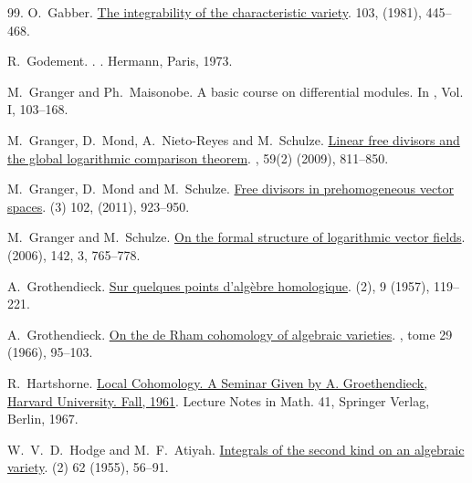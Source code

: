 \documentclass[12pt]{article}
\begin{document}
\begin{thebibliography}{99.}
 O.~Gabber.
\newblock \href{https://doi.org/10.2307/2374101}{The integrability of the characteristic variety}.
 103, (1981), 445--468.

 R.~Godement.
.
.
\newblock Hermann, Paris, 1973.

M.~Granger and Ph.~Maisonobe.
\newblock A basic course on differential modules.
In \cite{cimpa}, Vol. I, 103--168.

M.~Granger, D.~Mond, A.~Nieto-Reyes and M.~Schulze.
\newblock \href{http://aif.cedram.org/item?id=AIF_2009__59_2_811_0}{Linear free divisors and the global logarithmic comparison theorem}.
, 59(2) (2009), 811--850.

 M.~Granger, D.~Mond and M.~Schulze.
\newblock \href{https://doi.org/10.1112/plms/pdq046}{Free divisors in prehomogeneous vector spaces}.
 (3) 102, (2011), 923--950.

M.~Granger and M.~Schulze.
\newblock   \href{https://doi.org/10.1112/S0010437X06001916}{On the formal structure of logarithmic vector fields}.
 (2006), 142, 3, 765--778.

 A.~Grothendieck.
\newblock \href{https://doi.org/10.2748/tmj/1178244839}{Sur quelques points d'alg\`ebre homologique}.
 (2), 9 (1957), 119--221.


 A.~Grothendieck.
\newblock \href{http://www.numdam.org/item?id=PMIHES_1966__29__95_0}{On the de Rham cohomology of algebraic varieties}.
, tome 29 (1966), 95--103.

 R.~Hartshorne.
\newblock \href{https://doi.org/10.1007/BFb0073971}{Local Cohomology.
A Seminar Given by A. Groethendieck, Harvard University. Fall, 1961}.
\newblock Lecture Notes in Math. 41, Springer Verlag, Berlin, 1967.

  W.~V.~D.~Hodge and M.~F.~Atiyah.
\newblock \href{https://doi.org/10.2307/2007100}{Integrals of the second kind on an algebraic variety}.
 (2) 62 (1955), 56--91.


\end{thebibliography}
\end{document}
